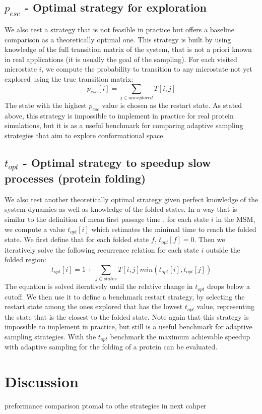\subsection{$p_{esc}$ - Optimal strategy for exploration}
We also test a strategy that is not feasible in practice but offers a baseline
comparison as a theoretically optimal one. This strategy is built by using knowledge
of the full transition matrix of the system, that is not a priori known in real
applications (it is usually the goal of the sampling).
For each visited microstate $i$, we
compute the probability to transition to any microstate not yet explored using
the true transition matrix:
%
$$p_{esc}[i]=\sum_{j \in unexplored}T[i, j]$$
%
The state with the highest $p_{esc}$ value is chosen as the restart state. As stated above,
this strategy is impossible to implement in practice for real protein
simulations, but it is as a useful benchmark for comparing adaptive sampling
strategies that aim to explore conformational space.

\subsection{$t_{opt}$ - Optimal strategy to speedup slow processes (protein folding)} 
We also test another theoretically optimal strategy given perfect knowledge of the
system dynamics as well as knowledge of the folded states. In a way that is
similar to the definition of mean first passage time \cite{mfptbook},
for each state $i$ in the MSM, we compute a value $t_{opt}[i]$ which 
estimates the minimal time to reach the folded state.
We first define that for each folded state $f$, $t_{opt}[f] = 0$. Then we
iteratively solve the following recurrence relation for each state $i$ outside the folded region:
%
$$t_{opt}[i]=1+\sum_{j \in states}T[i,j]min(t_{opt}[i],t_{opt}[j])$$
%
The equation is solved iteratively until the relative change in $t_{opt}$ drops
below a cutoff. We then use it to define a benchmark restart strategy, by
selecting the restart state among the ones explored that has the lowest
$t_{opt}$ value, representing the state that is the closest to the folded
state. Note again that this strategy is impossible to implement in
practice, but still is a useful benchmark for adaptive sampling strategies.
With the $t_{opt}$ benchmark the maximum achievable speedup with adaptive
sampling for the folding of a protein can be evaluated.


\section{\label{sec:methods}Discussion}
preformance comparison ptomal to  othe strategies in next cahper






















